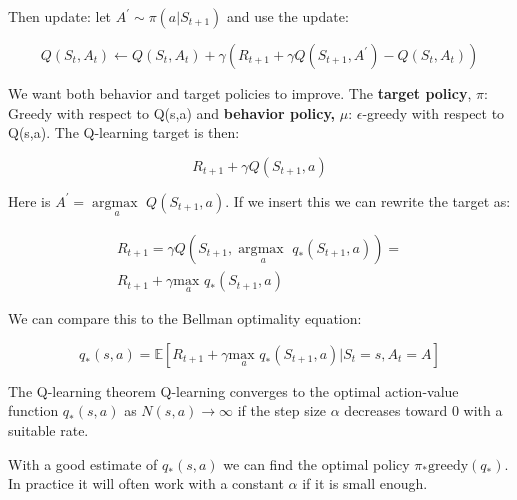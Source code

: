 Then update: let $A^{\prime} \sim \pi (a|S_{t+1})$ and use the update:

	\begin{equation}
		Q(S_t,A_t) \leftarrow Q(S_t,A_t) + \gamma(R_{t+1} + \gamma Q(S_{t+1},A^{\prime})-Q(S_t,A_t))
	\end{equation}

We want both behavior and target policies to improve. The \textbf{target policy}, $\pi$: Greedy with respect to Q(s,a) and \textbf{behavior policy, }$\mu$: $\epsilon$-greedy with respect to Q(s,a). The Q-learning target is then:

	\begin{equation}
 		R_{t+1} + \gamma Q(S_{t+1},a)
 	\end{equation}

Here is $A^{\prime} = \underset{a}{\arg \text{max }}Q(S_{t+1},a)$. If we insert this we can rewrite the target as:

	\begin{equation}
	\begin{aligned}
		R_{t+1} = \gamma Q(S_{t+1}, \underset{a}{\arg \text{max }} q_*(S_{t+1},a)) = \\
		R_{t+1} + \gamma \underset{a}{\text{max }}q_*(S_{t+1},a)
	\end{aligned}
	\end{equation}

We can compare this to the Bellman optimality equation:

	\begin{equation}
		q_*(s,a) = \mathbb{E}[R_{t+1} + \gamma \underset{a}{\text{max }}q_*(S_{t+1},a)|S_t=s,A_t =A]
	\end{equation}

\begin{wbox}{The Q-learning theorem}
Q-learning converges to the optimal action-value function $q_*(s,a)$ as $N(s,a) \rightarrow \infty$ if the step size $\alpha$ decreases toward 0 with a suitable rate.  
\end{wbox}

With a good estimate of $q_*(s,a)$ we can find the optimal policy $\pi_*\text{greedy}(q_*)$. In practice it will often work with a constant $\alpha$ if it is small enough. 

